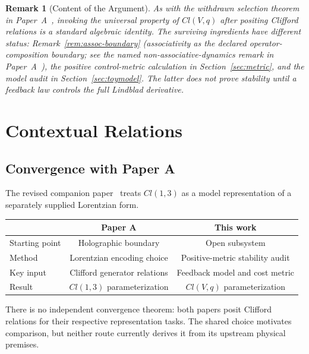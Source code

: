\documentclass[aps,pre,onecolumn,superscriptaddress,floatfix,longbibliography]{revtex4-2}
\newtheorem{remark}[theorem]{Remark}
\begin{document}
\begin{remark}[Content of the Argument]
\label{rem:scope}
As with the withdrawn selection theorem in Paper~A~\cite{Liu2026QRAIF_A}, invoking the universal property of $Cl(V,q)$ after positing Clifford relations is a standard algebraic identity.
The surviving ingredients have different status:
Remark~\ref{rem:assoc-boundary} (associativity as the declared operator-composition boundary; see the named non-associative-dynamics remark in Paper~A~\cite{Liu2026QRAIF_A}),
the positive control-metric calculation in Section~\ref{sec:metric}, and the model audit in Section~\ref{sec:toymodel}.  The latter does not prove stability until a feedback law controls the full Lindblad derivative.
\end{remark}

\section{Contextual Relations}
\label{sec:context}

\subsection{Convergence with Paper A}

The revised companion paper~\cite{Liu2026QRAIF_A} treats $Cl(1,3)$ as a model representation of a separately supplied Lorentzian form.

\begin{center}
\begin{tabular}{@{}lcc@{}}
\toprule
& \textbf{Paper A} & \textbf{This work} \\
\midrule
Starting point & Holographic boundary & Open subsystem \\
Method & Lorentzian encoding choice & Positive-metric stability audit \\
Key input & Clifford generator relations & Feedback model and cost metric \\
Result & $Cl(1,3)$ parameterization & $Cl(V,q)$ parameterization \\
\bottomrule
\end{tabular}
\end{center}

There is no independent convergence theorem: both papers posit Clifford relations for their respective representation tasks.  The shared choice motivates comparison, but neither route currently derives it from its upstream physical premises.
\end{document}
